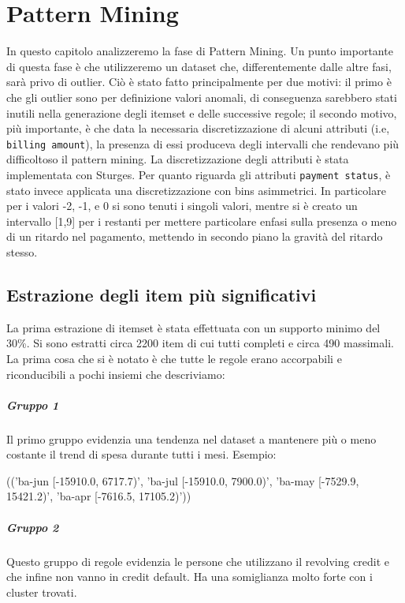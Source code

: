 \chapter{Pattern Mining}
In questo capitolo analizzeremo la fase di Pattern Mining.
Un punto importante di questa fase \`e che utilizzeremo un dataset che,
differentemente dalle altre fasi, sar\`a privo di outlier. Ci\`o \`e
stato fatto principalmente per due motivi: il primo \`e che gli outlier
sono per definizione valori anomali, di conseguenza sarebbero stati inutili nella generazione degli itemset e delle
successive regole; il secondo motivo, pi\`u importante, \`e che data la necessaria
discretizzazione di alcuni attributi (i.e, \texttt{billing amount}), la presenza
di essi produceva degli intervalli che rendevano pi\`u difficoltoso il pattern
mining.
La discretizzazione degli attributi \`e stata implementata con Sturges.
Per quanto riguarda gli attributi \texttt{payment status}, \`e stato
invece applicata una discretizzazione con bins asimmetrici.
In particolare per i valori -2, -1, e 0 si sono tenuti i singoli valori, mentre
si \`e creato un intervallo [1,9] per i restanti per mettere particolare enfasi
sulla presenza o meno di un ritardo nel pagamento, mettendo in secondo piano la
gravit\`a del ritardo stesso.

\section{Estrazione degli item pi\`u significativi}
La prima estrazione di itemset \`e stata effettuata con un supporto minimo del 30\%.
Si sono estratti circa 2200 item di cui tutti completi e circa 490 massimali.
La prima cosa che si \`e notato \`e che tutte le regole erano accorpabili e
riconducibili a pochi insiemi che descriviamo:

\paragraph{Gruppo 1}
Il primo gruppo evidenzia una tendenza nel dataset a mantenere pi\`u o meno
costante il trend di spesa durante tutti i mesi.
Esempio:
\begin{center}
	(('ba-jun [-15910.0, 6717.7)', 'ba-jul [-15910.0, 7900.0)', 'ba-may [-7529.9, 15421.2)', 'ba-apr [-7616.5, 17105.2)'))
\end{center}

\paragraph{Gruppo 2}
Questo gruppo di regole evidenzia le persone che utilizzano il revolving credit e
che infine non vanno in credit default. Ha una somiglianza molto forte con
i cluster trovati.

